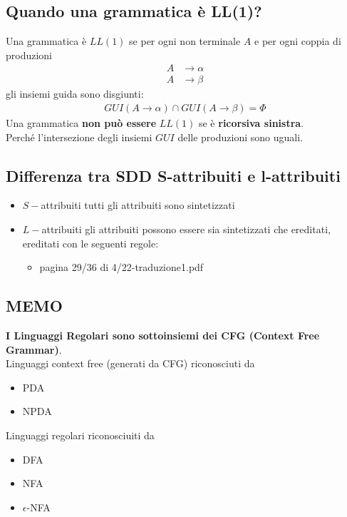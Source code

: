 \documentclass[12pt]{article}
\begin{document}
\subsection{Quando una grammatica è LL(1)?}
Una grammatica è $LL(1)$ se per ogni non terminale $A$ e per ogni coppia di produzioni
\begin{align*}
    A &\rightarrow \alpha\\
    A &\rightarrow \beta
\end{align*}
gli insiemi guida sono disgiunti:
\begin{align*}
    GUI(A \rightarrow \alpha) \cap GUI(A \rightarrow \beta) = \Phi
\end{align*}
Una grammatica \textbf{non può essere} $LL(1)$ se è \textbf{ricorsiva sinistra}.\\
Perché l'intersezione degli
insiemi $GUI$ delle produzioni sono uguali.
\subsection{Differenza tra SDD S-attribuiti e l-attribuiti}
\begin{itemize}
    \item $S-$attribuiti tutti gli attribuiti sono sintetizzati
    \item $L-$attribuiti gli attribuiti possono essere sia sintetizzati che ereditati, ereditati con le seguenti regole:
    \begin{itemize}
        \item pagina 29/36 di 4/22-traduzione1.pdf
    \end{itemize}
\end{itemize}
\subsection{MEMO}
\textbf{I Linguaggi Regolari sono sottoinsiemi dei CFG (Context Free Grammar)}.\\
Linguaggi context free (generati da CFG) riconosciuti da
\begin{itemize}
    \item PDA
    \item NPDA
\end{itemize}
Linguaggi regolari riconosciuiti da
\begin{itemize}
    \item DFA
    \item NFA
    \item $\epsilon$-NFA %
  \end{itemize}
\end{document}
